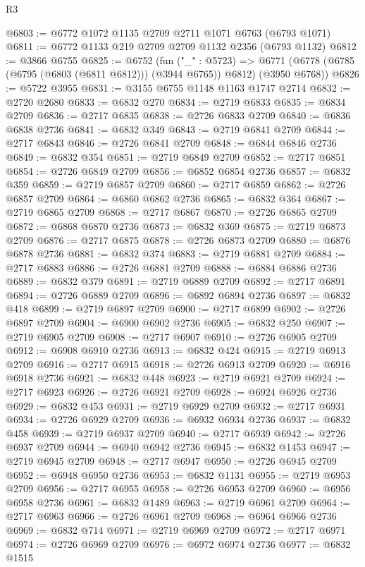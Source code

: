 \begin{lexlean}{R3}
\begin{coremodule}
@6803 := @6772 @1072 @1135 @2709 @2711 @1071 @6763 (@6793 @1071)
@6811 := @6772 @1133 @219 @2709 @2709 @1132 @2356 (@6793 @1132)
@6812 := @3866 @6755
@6825 := @6752
    (fun ("_" : @5723) =>
    @6771 (@6778 (@6785 (@6795 (@6803 (@6811 @6812))) (@3944 @6765)) @6812) (@3950 @6768))
@6826 := @5722 @3955
@6831 := @3155 @6755 @1148 @1163 @1747 @2714
@6832 := @2720 @2680
@6833 := @6832 @270
@6834 := @2719 @6833
@6835 := @6834 @2709
@6836 := @2717 @6835
@6838 := @2726 @6833 @2709
@6840 := @6836 @6838 @2736
@6841 := @6832 @349
@6843 := @2719 @6841 @2709
@6844 := @2717 @6843
@6846 := @2726 @6841 @2709
@6848 := @6844 @6846 @2736
@6849 := @6832 @354
@6851 := @2719 @6849 @2709
@6852 := @2717 @6851
@6854 := @2726 @6849 @2709
@6856 := @6852 @6854 @2736
@6857 := @6832 @359
@6859 := @2719 @6857 @2709
@6860 := @2717 @6859
@6862 := @2726 @6857 @2709
@6864 := @6860 @6862 @2736
@6865 := @6832 @364
@6867 := @2719 @6865 @2709
@6868 := @2717 @6867
@6870 := @2726 @6865 @2709
@6872 := @6868 @6870 @2736
@6873 := @6832 @369
@6875 := @2719 @6873 @2709
@6876 := @2717 @6875
@6878 := @2726 @6873 @2709
@6880 := @6876 @6878 @2736
@6881 := @6832 @374
@6883 := @2719 @6881 @2709
@6884 := @2717 @6883
@6886 := @2726 @6881 @2709
@6888 := @6884 @6886 @2736
@6889 := @6832 @379
@6891 := @2719 @6889 @2709
@6892 := @2717 @6891
@6894 := @2726 @6889 @2709
@6896 := @6892 @6894 @2736
@6897 := @6832 @418
@6899 := @2719 @6897 @2709
@6900 := @2717 @6899
@6902 := @2726 @6897 @2709
@6904 := @6900 @6902 @2736
@6905 := @6832 @250
@6907 := @2719 @6905 @2709
@6908 := @2717 @6907
@6910 := @2726 @6905 @2709
@6912 := @6908 @6910 @2736
@6913 := @6832 @424
@6915 := @2719 @6913 @2709
@6916 := @2717 @6915
@6918 := @2726 @6913 @2709
@6920 := @6916 @6918 @2736
@6921 := @6832 @448
@6923 := @2719 @6921 @2709
@6924 := @2717 @6923
@6926 := @2726 @6921 @2709
@6928 := @6924 @6926 @2736
@6929 := @6832 @453
@6931 := @2719 @6929 @2709
@6932 := @2717 @6931
@6934 := @2726 @6929 @2709
@6936 := @6932 @6934 @2736
@6937 := @6832 @458
@6939 := @2719 @6937 @2709
@6940 := @2717 @6939
@6942 := @2726 @6937 @2709
@6944 := @6940 @6942 @2736
@6945 := @6832 @1453
@6947 := @2719 @6945 @2709
@6948 := @2717 @6947
@6950 := @2726 @6945 @2709
@6952 := @6948 @6950 @2736
@6953 := @6832 @1131
@6955 := @2719 @6953 @2709
@6956 := @2717 @6955
@6958 := @2726 @6953 @2709
@6960 := @6956 @6958 @2736
@6961 := @6832 @1489
@6963 := @2719 @6961 @2709
@6964 := @2717 @6963
@6966 := @2726 @6961 @2709
@6968 := @6964 @6966 @2736
@6969 := @6832 @714
@6971 := @2719 @6969 @2709
@6972 := @2717 @6971
@6974 := @2726 @6969 @2709
@6976 := @6972 @6974 @2736
@6977 := @6832 @1515

\end{coremodule}
\end{lexlean}
